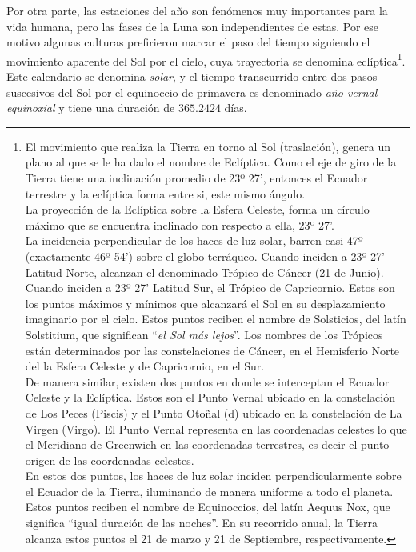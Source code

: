  Por otra parte, las estaciones del a\~no son fen\'omenos muy importantes para la vida humana, pero las fases de la Luna son independientes de estas. Por ese motivo algunas culturas prefirieron marcar el paso del tiempo siguiendo el movimiento aparente del Sol por el cielo, cuya trayectoria se denomina ecl\'iptica\footnote{El movimiento que realiza la Tierra en torno al Sol (traslación), genera un plano al que se le ha dado el nombre de Eclíptica. Como el eje de giro de la Tierra tiene una inclinación promedio de 23º 27', entonces el Ecuador terrestre y la eclíptica forma entre si, este mismo ángulo.\\La proyección de la Eclíptica sobre la Esfera Celeste, forma un círculo máximo que se encuentra inclinado con respecto a ella, 23º 27'.
\\
 La incidencia perpendicular de los haces de luz solar, barren casi 47º (exactamente 46º 54') sobre el globo terráqueo. Cuando inciden a 23º 27' Latitud Norte, alcanzan el denominado Trópico de Cáncer (21 de Junio). Cuando inciden a 23º 27' Latitud Sur, el Trópico de Capricornio. Estos son los puntos máximos y mínimos que alcanzará el Sol en su desplazamiento imaginario por el cielo. Estos puntos reciben el nombre de Solsticios, del latín Solstitium, que significan ``\emph{el Sol más lejos}''. Los nombres de los Trópicos están determinados por las constelaciones de Cáncer, en el Hemisferio Norte del la Esfera Celeste y de Capricornio, en el Sur.
\\
De manera similar, existen dos puntos en donde se interceptan el Ecuador Celeste y la Eclíptica. Estos son el Punto Vernal  ubicado en la constelación de Los Peces (Piscis) y el Punto Otoñal (d) ubicado en la constelación de La Virgen (Virgo). El Punto Vernal representa en las coordenadas celestes lo que el Meridiano de Greenwich en las coordenadas terrestres, es decir el punto origen de las coordenadas celestes.
\\
En estos dos puntos, los haces de luz solar inciden perpendicularmente sobre el Ecuador de la Tierra, iluminando de manera uniforme a todo el planeta. Estos puntos reciben el nombre de Equinoccios, del latín Aequus Nox, que significa “igual duración de las noches”. En su recorrido anual, la Tierra alcanza estos puntos el 21 de marzo y 21 de Septiembre, respectivamente. }. Este calendario se denomina \emph{solar}, y el tiempo transcurrido entre dos pasos suscesivos del Sol por el equinoccio de primavera es denominado \emph{a\~no vernal equinoxial} y tiene una duraci\'on de $365.2424$ d\'ias.

